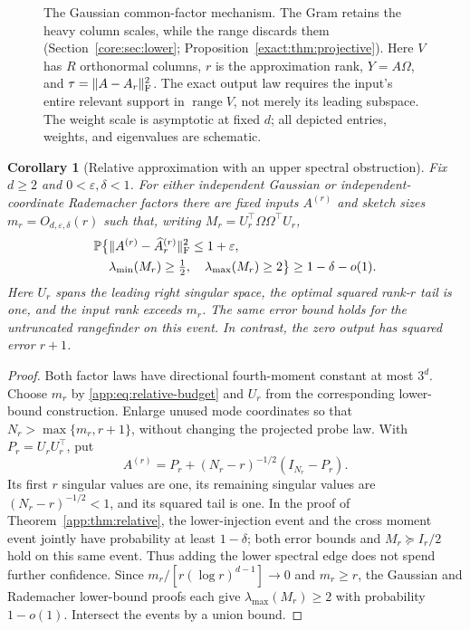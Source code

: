 \documentclass[11pt,a4paper]{article}
\newtheorem{corollary}[theorem]{Corollary}
\theoremstyle{definition}\newtheorem{definition}[theorem]{Definition}
\theoremstyle{remark}\newtheorem{remark}[theorem]{Remark}
\numberwithin{equation}{section}
\newcommand{\norm}[1]{\lVert#1\rVert}\newcommand{\ip}[2]{\langle#1,#2\rangle}
\DeclareMathOperator{\range}{range}\DeclareMathOperator{\diag}{diag}
\begin{document}
\begin{figure}[H]
{%
}
\endgroup
\caption{The Gaussian common-factor mechanism. The Gram retains the heavy
column scales, while the range discards them
(Section~\ref{core:sec:lower}; Proposition~\ref{exact:thm:projective}).
Here $V$ has $R$ orthonormal columns, $r$ is the approximation rank,
$Y=A\Omega$, and $\tau=\norm{A-A_r}_{\F}^2$.
The exact output law requires the input's entire relevant support in
$\range V$, not merely its leading subspace. The weight scale is asymptotic
at fixed $d$; all depicted entries, weights, and eigenvalues are schematic.}
\label{fig:mechanism}
\end{figure}

\begin{corollary}[Relative approximation with an upper spectral obstruction]
\label{separation:cor:same-input}
Fix $d\ge2$ and $0<\varepsilon,\delta<1$. For either independent
Gaussian or independent-coordinate Rademacher factors there are fixed
inputs $A^{(r)}$ and sketch sizes $m_r=O_{d,\varepsilon,\delta}(r)$ such that,
writing $M_r=U_r^\top\Omega\Omega^\top U_r$,
\begin{align*}
 \Pp\bigl\{&\norm{A^{(r)}-\widehat A^{(r)}_r}_\F^2\le1+\varepsilon,\\
 &\lambda_{\min}(M_r)\ge\tfrac12,\quad\lambda_{\max}(M_r)\ge2\bigr\}
 \ge1-\delta-o(1).
\end{align*}
Here $U_r$ spans the leading right singular space, the optimal squared
rank-$r$ tail is one, and the input rank exceeds $m_r$. The same error
bound holds for the untruncated rangefinder on this event. In contrast,
the zero output has squared error $r+1$.
\end{corollary}
\begin{proof}
Both factor laws have directional fourth-moment constant at most $3^d$.
Choose $m_r$ by \eqref{app:eq:relative-budget} and $U_r$ from the
corresponding lower-bound construction. Enlarge unused mode coordinates
so that $N_r>\max\{m_r,r+1\}$, without changing the projected probe law.
With $P_r=U_rU_r^\top$, put
\[
 A^{(r)}=P_r+(N_r-r)^{-1/2}(I_{N_r}-P_r).
\]
Its first $r$ singular values are one, its remaining singular values are
$(N_r-r)^{-1/2}<1$, and its squared tail is one. In the proof of
Theorem~\ref{app:thm:relative}, the lower-injection event and the cross
moment event jointly have probability at least $1-\delta$; both error
bounds and $M_r\succeq I_r/2$ hold on this same event. Thus adding the
lower spectral edge does not spend further confidence. Since
$m_r/[r(\log r)^{d-1}]\to0$ and $m_r\ge r$, the Gaussian and Rademacher
lower-bound proofs each give $\lambda_{\max}(M_r)\ge2$ with probability
$1-o(1)$. Intersect the events by a union bound.
\end{proof}
\end{document}
